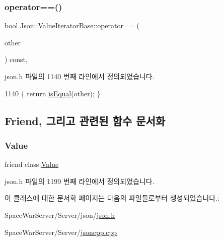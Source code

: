 \subsubsection{\texorpdfstring{operator==()}{operator==()}}
{\footnotesize\ttfamily bool Json\+::\+Value\+Iterator\+Base\+::operator== (\begin{DoxyParamCaption}\item[{const \hyperlink{class_json_1_1_value_iterator_base_a9d2a940d03ea06d20d972f41a89149ee}{Self\+Type} \&}]{other }\end{DoxyParamCaption}) const\hspace{0.3cm}{\ttfamily [inline]}, {\ttfamily [inherited]}}



json.\+h 파일의 1140 번째 라인에서 정의되었습니다.


\begin{DoxyCode}
1140 \{ \textcolor{keywordflow}{return} \hyperlink{class_json_1_1_value_iterator_base_a010b5ad3f3337ae3732e5d7e16ca5e25}{isEqual}(other); \}
\end{DoxyCode}


\subsection{Friend, 그리고 관련된 함수 문서화}
\mbox{\label{class_json_1_1_value_const_iterator_aeceedf6e1a7d48a588516ce2b1983d6f}} 
\subsubsection{\texorpdfstring{Value}{Value}}
{\footnotesize\ttfamily friend class \hyperlink{class_json_1_1_value}{Value}\hspace{0.3cm}{\ttfamily [friend]}}



json.\+h 파일의 1199 번째 라인에서 정의되었습니다.



이 클래스에 대한 문서화 페이지는 다음의 파일들로부터 생성되었습니다.\+:\begin{DoxyCompactItemize}
\item 
Space\+War\+Server/\+Server/json/\hyperlink{json_8h}{json.\+h}\item 
Space\+War\+Server/\+Server/\hyperlink{jsoncpp_8cpp}{jsoncpp.\+cpp}\end{DoxyCompactItemize}
